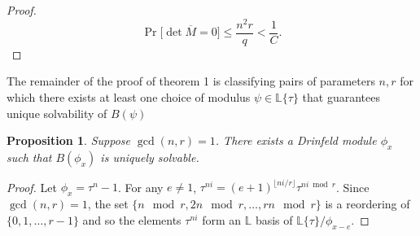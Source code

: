\documentclass[sigconf]{acmart}
\newtheorem{prop}{Proposition}
\renewcommand{\L}{\mathbb{L}}
\newcommand{\sring}{\L\{\tau\}}
\newcommand{\sqdet}{\det}
\begin{document}
\begin{proof}


\begin{equation*}
    \Pr\Big[\det \overline{M} = 0\Big] \leq \frac{n^2r}{q} < \frac{1}{C}.
\end{equation*}

\end{proof}





The remainder of the proof of theorem 1 is classifying pairs of parameters $n,r$ for which there exists at least one choice of modulus $\psi \in \sring$ that guarantees unique solvability of $B(\psi)$

\begin{prop}\label{coprime}
Suppose $\gcd(n,r) = 1$. There exists a Drinfeld module $\phi_x$ such that $ B(\phi_x)$ is uniquely solvable.  %
\end{prop}
\begin{proof}
Let $\phi_x = \tau^n - 1$. For any $e \neq 1$, $\tau^{ni} = (e + 1)^{\lfloor ni/r \rfloor} \tau^{ni \bmod r}$. Since $\gcd(n,r) = 1$, the set $\{ n \mod r, 2n \mod r, \ldots, rn \mod r\}$ is a reordering of $\{0, 1, \ldots, r-1\}$ and so the elements $\tau^{ni}$ form an $\L$ basis of $\L\{ \tau\}/\phi_{x - e}$.
\end{proof}
\end{document}
